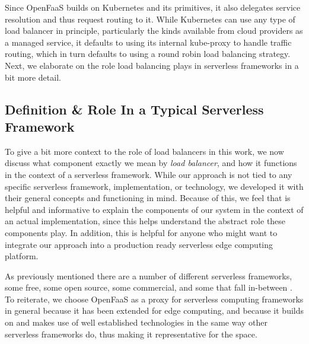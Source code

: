 \documentclass[draft,final]{vutinfth} %
\begin{document}
Since OpenFaaS\cite{openfaas} builds on Kubernetes and its primitives, it also delegates service resolution and thus request routing to it.
While Kubernetes can use any type of load balancer in principle, particularly the kinds available from cloud providers as a managed service, it defaults to using its internal kube-proxy to handle traffic routing, which in turn defaults to using a round robin load balancing strategy.
Next, we elaborate on the role load balancing plays in serverless frameworks in a bit more detail.


\subsection{ Definition \& Role In a Typical Serverless Framework}
To give a bit more context to the role of load balancers in this work, we now discuss what component exactly we mean by \textit{load balancer}, and how it functions in the context of a serverless framework. While our approach is not tied to any specific serverless framework, implementation, or technology, we developed it with their general concepts and functioning in mind. Because of this, we feel that is helpful and informative to explain the components of our system in the context of an actual implementation, since this helps understand the abstract role these components play. In addition, this is helpful for anyone who might want to integrate our approach into a production ready serverless edge computing platform.

As previously mentioned there are a number of different serverless frameworks, some free, some open source, some commercial, and some that fall in-between\cite{aws-lambda}\cite{azure-functions} \cite{openfaas-gateway}\cite{kubeless}\cite{openwhisk}.
To reiterate, we choose OpenFaaS as a proxy for serverless computing frameworks in general because it has been extended for edge computing, and because it builds on and makes use of well established technologies in the same way other serverless frameworks do\cite{kubeless}\cite{openwhisk}, thus making it representative for the space.
\end{document}
